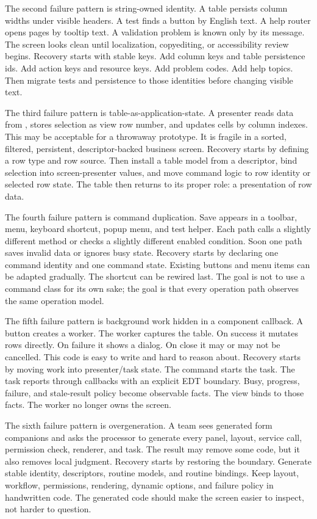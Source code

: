 The second failure pattern is string-owned identity. A table persists column
widths under visible headers. A test finds a button by English text. A help
router opens pages by tooltip text. A validation problem is known only by its
message. The screen looks clean until localization, copyediting, or
accessibility review begins. Recovery starts with stable keys. Add column
keys and table persistence ids. Add action keys and resource keys. Add problem
codes. Add help topics. Then migrate tests and persistence to those identities
before changing visible text.

The third failure pattern is table-as-application-state. A presenter reads
data from , stores selection as view row number, and
updates cells by column indexes. This may be acceptable for a throwaway
prototype. It is fragile in a sorted, filtered, persistent, descriptor-backed
business screen. Recovery starts by defining a row type and row source. Then
install a table model from a descriptor, bind selection into screen-presenter values,
and move command logic to row identity or selected row state. The table then
returns to its proper role: a presentation of row data.

The fourth failure pattern is command duplication. Save appears in a toolbar,
menu, keyboard shortcut, popup menu, and test helper. Each path calls a
slightly different method or checks a slightly different enabled condition.
Soon one path saves invalid data or ignores busy state. Recovery starts by
declaring one command identity and one command state. Existing buttons and
menu items can be adapted gradually. The shortcut can be rewired last. The
goal is not to use a command class for its own sake; the goal is that every
operation path observes the same operation model.

The fifth failure pattern is background work hidden in a component callback.
A button creates a worker. The worker captures the table. On success it
mutates rows directly. On failure it shows a dialog. On close it may or may
not be cancelled. This code is easy to write and hard to reason about.
Recovery starts by moving work into presenter/task state. The command starts
the task. The task reports through callbacks with an explicit EDT boundary.
Busy, progress, failure, and stale-result policy become observable facts. The
view binds to those facts. The worker no longer owns the screen.

The sixth failure pattern is overgeneration. A team sees generated form
companions and asks the processor to generate every panel, layout, service
call, permission check, renderer, and task. The result may remove some code,
but it also removes local judgment. Recovery starts by restoring the boundary.
Generate stable identity, descriptors, routine models, and routine bindings.
Keep layout, workflow, permissions, rendering, dynamic options, and failure
policy in handwritten code. The generated code should make the screen easier
to inspect, not harder to question.

